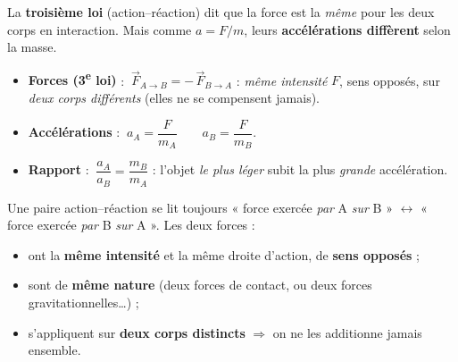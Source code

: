 \documentclass[11pt,a4paper]{article}
\newcommand{\vv}[1]{\vec{#1}}\newcommand{\ds}{\displaystyle}
\begin{document}

\noindent La \textbf{troisième loi} (action--réaction) dit que la force est la \emph{même} pour les deux
corps en interaction. Mais comme $a=F/m$, leurs \textbf{accélérations diffèrent} selon la masse.

\begin{cle}
\begin{itemize}[leftmargin=1.5em,itemsep=3pt]
  \item \textbf{Forces (3\textsuperscript{e} loi)} : $\ \vv F_{A\to B}=-\,\vv F_{B\to A}$ : \emph{même intensité}
        $F$, sens opposés, sur \emph{deux corps différents} (elles ne se compensent jamais).
  \item \textbf{Accélérations} : $\ \boxed{a_A=\dfrac{F}{m_A}}\qquad a_B=\dfrac{F}{m_B}$.
  \item \textbf{Rapport} : $\ \dfrac{a_A}{a_B}=\dfrac{m_B}{m_A}$ : l'objet \emph{le plus léger} subit la plus
        \emph{grande} accélération.
\end{itemize}
\end{cle}

\begin{center}
\end{center}

\begin{methode}
Une paire action--réaction se lit toujours « force exercée \emph{par} A \emph{sur} B » $\leftrightarrow$
« force exercée \emph{par} B \emph{sur} A ». Les deux forces :
\begin{itemize}[leftmargin=1.5em,topsep=2pt,itemsep=1.5pt]
  \item ont la \textbf{même intensité} et la même droite d'action, de \textbf{sens opposés} ;
  \item sont de \textbf{même nature} (deux forces de contact, ou deux forces gravitationnelles\dots) ;
  \item s'appliquent sur \textbf{deux corps distincts} $\Rightarrow$ on ne les additionne jamais ensemble.
\end{itemize}
\end{methode}
\end{document}
